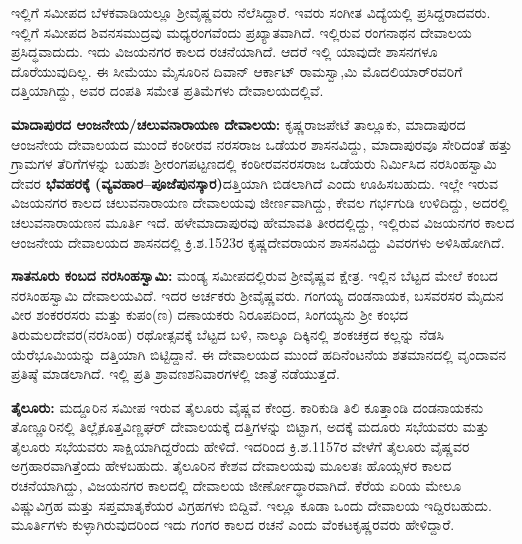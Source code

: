 ಇಲ್ಲಿಗೆ ಸಮೀಪದ ಬೆಳಕವಾಡಿಯಲ್ಲೂ ಶ‍್ರೀವೈಷ್ಣವರು ನೆಲೆಸಿದ್ದಾರೆ. ಇವರು ಸಂಗೀತ ವಿದ್ಯೆಯಲ್ಲಿ ಪ್ರಸಿದ್ದರಾದವರು. ಇಲ್ಲಿಗೆ ಸಮೀಪದ ಶಿವನಸಮುದ್ರವು ಮಧ್ಯರಂಗವೆಂದು ಪ್ರಖ್ಯಾತವಾಗಿದೆ. ಇಲ್ಲಿರುವ ರಂಗನಾಥನ ದೇವಾಲಯ ಪ್ರಸಿದ್ಧವಾದುದು. ಇದು ವಿಜಯನಗರ ಕಾಲದ ರಚನೆಯಾಗಿದೆ. ಆದರೆ ಇಲ್ಲಿ ಯಾವುದೇ ಶಾಸನಗಳೂ ದೊರೆಯುವುದಿಲ್ಲ. ಈ ಸೀಮೆಯು ಮೈಸೂರಿನ ದಿವಾನ್​ ಆರ್ಕಾಟ್​ ರಾಮಸ್ವಾ,ಮಿ ಮೊದಲಿಯಾರ್​ರವರಿಗೆ ದತ್ತಿಯಾಗಿದ್ದು, ಅವರ ದಂಪತಿ ಸಮೇತ ಪ್ರತಿಮೆಗಳು ದೇವಾಲಯದಲ್ಲಿವೆ.

\textbf{ಮಾದಾಪುರದ ಆಂಜನೇಯ/ಚಲುವನಾರಾಯಣ ದೇವಾಲಯ:} ಕೃಷ್ಣರಾಜಪೇಟೆ ತಾಲ್ಲೂಕು, ಮಾದಾಪುರದ ಆಂಜನೇಯ ದೇವಾಲಯದ ಮುಂದೆ ಕಂಠೀರವ ನರಸರಾಜ ಒಡೆಯರ ಶಾಸನವಿದ್ದು, ಮಾದಾಪುರವೂ ಸೇರಿದಂತೆ ಹತ್ತು ಗ್ರಾಮಗಳ ತೆರಿಗೆಗಳನ್ನು ಬಹುಶಃ ಶ‍್ರೀರಂಗಪಟ್ಟಣದಲ್ಲಿ ಕಂಠೀರವನರಸರಾಜ ಒಡೆಯರು ನಿರ್ಮಿಸಿದ ನರಸಿಂಹಸ್ವಾಮಿ ದೇವರ \textbf{ಭೆವಹರಕ್ಕೆ (ವ್ಯವಹಾರ–ಪೂಜೆಪುನಸ್ಕಾರ)}ದತ್ತಿಯಾಗಿ ಬಿಡಲಾಗಿದೆ ಎಂದು ಊಹಿಸಬಹುದು. ಇಲ್ಲೇ ಇರುವ ವಿಜಯನಗರ ಕಾಲದ ಚಲುವನಾರಾಯಣ ದೇವಾಲಯವು ಜೀರ್ಣವಾಗಿದ್ದು, ಕೇವಲ ಗರ್ಭಗುಡಿ ಉಳಿದಿದ್ದು, ಅದರಲ್ಲಿ ಚಲುವನಾರಾಯಣನ ಮೂರ್ತಿ ಇದೆ. ಹಳೇಮಾದಾಪುರವು ಹೇಮಾವತಿ ತೀರದಲ್ಲಿದ್ದು, ಇಲ್ಲಿರುವ ವಿಜಯನಗರ ಕಾಲದ ಆಂಜನೇಯ ದೇವಾಲಯದ ಶಾಸನದಲ್ಲಿ ಕ್ರಿ.ಶ.1523ರ ಕೃಷ್ಣದೇವರಾಯನ ಶಾಸನವಿದ್ದು ವಿವರಗಳು ಅಳಿಸಿಹೋಗಿದೆ.

\textbf{ಸಾತನೂರು ಕಂಬದ ನರಸಿಂಹಸ್ವಾಮಿ:} ಮಂಡ್ಯ ಸಮೀಪದಲ್ಲಿರುವ ಶ‍್ರೀವೈಷ್ಣವ ಕ್ಷೇತ್ರ. ಇಲ್ಲಿನ ಬೆಟ್ಟದ ಮೇಲೆ ಕಂಬದ ನರಸಿಂಹಸ್ವಾಮಿ ದೇವಾಲಯವಿದೆ. ಇದರ ಅರ್ಚಕರು ಶ‍್ರೀವೈಷ್ಣವರು. ಗಂಗಯ್ಯ ದಂಡನಾಯಕ, ಬಸವರಸರ ಮೈದುನ ವೀರ ಶಂಕರರಸರು ಮತ್ತು ಕುಪಂ(ಣ) ದಣಾಯಕರು ನಿರೂಪದಿಂದ, ಸಿಂಗಯ್ಯನು ಶ‍್ರೀ ಕಂಭದ ತಿರುಮಲದೇವರ(ನರಸಿಂಹ) ರಥೋತ್ಸವಕ್ಕೆ ಬೆಟ್ಟದ ಬಳಿ, ನಾಲ್ಕೂ ದಿಕ್ಕಿನಲ್ಲಿ ಶಂಕಚಕ್ರದ ಕಲ್ಲನ್ನು ನೆಡಸಿ ಯೆರೆಭೂಮಿಯನ್ನು ದತ್ತಿಯಾಗಿ ಬಿಟ್ಟಿದ್ದಾನೆ. ಈ ದೇವಾಲಯದ ಮುಂದೆ ಹದಿನೆಂಟನೆಯ ಶತಮಾನದಲ್ಲಿ ವೃಂದಾವನ ಪ್ರತಿಷ್ಠೆ ಮಾಡಲಾಗಿದೆ. ಇಲ್ಲಿ ಪ್ರತಿ ಶ್ರಾವಣಶನಿವಾರಗಳಲ್ಲಿ ಜಾತ್ರೆ ನಡೆಯುತ್ತದೆ.

\textbf{ತೈಲೂರು:} ಮದ್ದೂರಿನ ಸಮೀಪ ಇರುವ ತೈಲೂರು ವೈಷ್ಣವ ಕೇಂದ್ರ. ಕಾರಿಕುಡಿ ತಿಲಿ ಕೂತ್ತಾಂಡಿ ದಂಡನಾಯಕನು ತೊಣ್ಣೂರಿನಲ್ಲಿ ತಿಲ್ಲೈಕೂತ್ತವಿಣ್ಣಘರ್​ ದೇವಾಲಯಕ್ಕೆ ದತ್ತಿಗಳನ್ನು ಬಿಟ್ಟಾಗ, ಅದಕ್ಕೆ ಮದೂರು ಸಭೆಯವರು ಮತ್ತು ತೈಲೂರು ಸಭೆಯವರು ಸಾಕ್ಷಿಯಾಗಿದ್ದರೆಂದು ಹೇಳಿದೆ. ಇದರಿಂದ ಕ್ರಿ.ಶ.1157ರ ವೇಳೆಗೆ ತೈಲೂರು ವೈಷ್ಣವರ ಅಗ್ರಹಾರವಾಗಿತ್ತೆಂದು ಹೇಳಬಹುದು. ತೈಲೂರಿನ ಕೇಶವ ದೇವಾಲಯವು ಮೂಲತಃ ಹೊಯ್ಸಳರ ಕಾಲದ ರಚನೆಯಾಗಿದ್ದು, ವಿಜಯನಗರ ಕಾಲದಲ್ಲಿ ದೇವಾಲಯ ಜೀರ್ಣೋದ್ಧಾರವಾಗಿದೆ. ಕೆರೆಯ ಏರಿಯ ಮೇಲೂ ವಿಷ್ಣುವಿಗ್ರಹ ಮತ್ತು ಸಪ್ತಮಾತೃಕೆಯರ ವಿಗ್ರಹಗಳು ಬಿದ್ದಿವೆ. ಇಲ್ಲೂ ಕೂಡಾ ಒಂದು ದೇವಾಲಯ ಇದ್ದಿರಬಹುದು. ಮೂರ್ತಿಗಳು ಕುಳ್ಳಾಗಿರುವುದರಿಂದ ಇದು ಗಂಗರ ಕಾಲದ ರಚನೆ ಎಂದು ವೆಂಕಟಕೃಷ್ಣರವರು ಹೇಳಿದ್ದಾರೆ.

